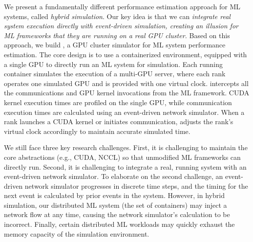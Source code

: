 We present a fundamentally different performance estimation approach for ML systems, called \textit{hybrid simulation}. Our key idea is that we can \textit{integrate real system execution directly with event-driven simulation, creating an illusion for ML frameworks that they are running on a real GPU cluster.} 
Based on this approach, we build \sys, a GPU cluster simulator for ML system performance estimation. The core design is to use a containerized environment, equipped with a single GPU to directly run an ML system for simulation. Each running container simulates the execution of a multi-GPU server, where each rank operates one simulated GPU and is provided with one virtual clock. \sys intercepts all the communications and GPU kernel invocations from the ML framework. CUDA kernel execution times are profiled on the single GPU, while communication execution times are calculated using an event-driven network simulator. When a rank launches a CUDA kernel or initiates communication, \sys adjusts the rank's virtual clock accordingly to maintain accurate simulated time.

We still face three key research challenges. First, it is challenging to maintain the core abstractions (e.g., CUDA, NCCL) so that unmodified ML frameworks can directly run. Second, it is challenging to integrate a real, running system with an event-driven network simulator. To elaborate on the second challenge, an event-driven network simulator progresses in discrete time steps, and the timing for the next event is calculated by prior events in the system. However, in hybrid simulation, our distributed ML system (the set of containers) may inject a network flow at any time, causing the network simulator's calculation to be incorrect.
Finally, certain distributed ML workloads may quickly exhaust the memory capacity of the simulation environment.



